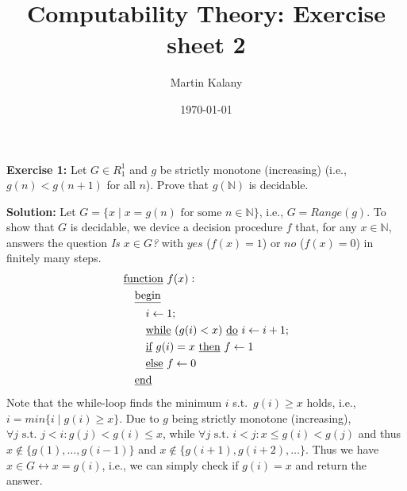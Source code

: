 \documentclass [11pt]{article}
\title{Computability Theory: Exercise sheet 2}
\author{Martin Kalany}
\date{\today}
\newcommand{\N}{\ensuremath{\mathbb{N}}}
\newcommand{\lra}{\ensuremath{\leftrightarrow}}
\begin{document}
\maketitle

\bigskip
\noindent
\textbf{Exercise 1:} Let $G \in R^1_1$ and $g$ be strictly monotone (increasing) (i.e., $g(n) < g(n+1)$ for all $n$). Prove that $g(\N)$ is decidable.

\noindent
\textbf{Solution:} Let $G = \{x \mid x = g(n) \text{ for some } n\in \N\}$, i.e., $G = Range(g)$.
To show that $G$ is decidable, we device a decision procedure $f$ that, for any $x\in \N$, answers the question \emph{Is $x \in G$?} with $yes$ ($f(x) = 1$) or $no$ ($f(x) = 0$) in finitely many steps.
\begin{align*}
& \text{\underline{function} } f(x): \\
& \quad \text{\underline{begin}} \\
& \quad \quad i \leftarrow 1; \\
& \quad \quad \text{\underline{while} } (g(i) < x) \text{ \underline{do} } i \leftarrow i +1; \\
& \quad \quad \text{\underline{if} } g(i) = x \text{ \underline{then} } f \leftarrow 1\\
& \quad \quad \text{\underline{else} } f \leftarrow 0\\
& \quad \text{\underline{end}}
\end{align*}
Note that the while-loop finds the minimum $i$ s.t.\ $g(i) \geq x$ holds, i.e., $i= min\{i \mid g(i) \geq x\}$. 
Due to $g$ being strictly monotone (increasing), $\forall j \text{ s.t.\ } j < i: g(j) < g(i) \leq x$, while $\forall j \text{ s.t.\ } i < j: x \leq g(i) < g(j)$ and thus $x \not \in \{g(1),\dots, g(i-1) \}$ and $x\not \in \{g(i+1), g(i+2),\dots\}$.
Thus we have $x\in G \lra x = g(i)$, i.e., we can simply check if $g(i) = x$ and return the answer.
\end{document}
